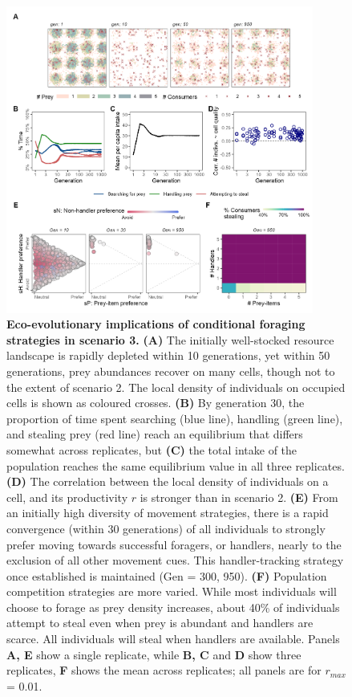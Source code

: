 \begin{refsection}[sorting=nyt]
\begin{figure}[t!]
    \centering
    \includegraphics[width=0.9\textwidth]{figures/kleptomove/fig_04.png}
    \caption{
        \textbf{Eco-evolutionary implications of conditional foraging strategies in scenario 3.}
        \textbf{(A)} The initially well-stocked resource landscape is rapidly depleted within 10 generations, yet within 50 generations, prey abundances recover on many cells, though not to the extent of scenario 2.
        The local density of individuals on occupied cells is shown as coloured crosses. 
        \textbf{(B)} By generation 30, the proportion of time spent searching (blue line), handling (green line), and stealing prey (red line) reach an equilibrium that differs somewhat across replicates, but \textbf{(C)} the total intake of the population reaches the same equilibrium value in all three replicates.
        \textbf{(D)} The correlation between the local density of individuals on a cell, and its productivity $r$ is stronger than in scenario 2.
        \textbf{(E)} From an initially high diversity of movement strategies, there is a rapid convergence (within 30 generations) of all individuals to strongly prefer moving towards successful foragers, or handlers, nearly to the exclusion of all other movement cues.
        This handler-tracking strategy once established is maintained (Gen = 300, 950).
        \textbf{(F)} Population competition strategies are more varied. While most individuals will choose to forage as prey density increases, about 40\% of individuals attempt to steal even when prey is abundant and handlers are scarce.
        All individuals will steal when handlers are available.
        Panels \textbf{A, E} show a single replicate, while \textbf{B, C} and \textbf{D} show three replicates, \textbf{F} shows the mean across replicates; all panels are for $r_{max}$ = 0.01.
    }
    \label{fig4}
\end{figure}


\end{refsection}
